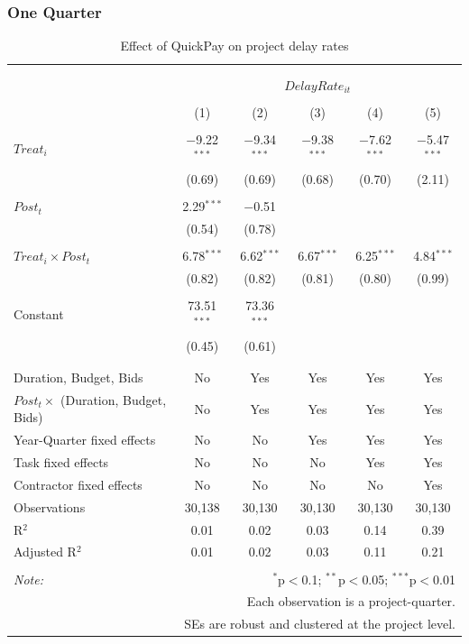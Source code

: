 \documentclass[
]{article}
\begin{document}
\hypertarget{one-quarter-4}{%
\subsubsection{One Quarter}\label{one-quarter-4}}

\begin{table}[H] \centering 
  \caption{Effect of QuickPay on project delay rates} 
  \label{} 
\small 
\begin{tabular}{@{\extracolsep{-2pt}}lccccc} 
\\[-1.8ex]\hline 
\hline \\[-1.8ex] 
\\[-1.8ex] & \multicolumn{5}{c}{$DelayRate_{it}$} \\ 
\\[-1.8ex] & (1) & (2) & (3) & (4) & (5)\\ 
\hline \\[-1.8ex] 
 $Treat_i$ & $-$9.22$^{***}$ & $-$9.34$^{***}$ & $-$9.38$^{***}$ & $-$7.62$^{***}$ & $-$5.47$^{***}$ \\ 
  & (0.69) & (0.69) & (0.68) & (0.70) & (2.11) \\ 
  & & & & & \\ 
 $Post_t$ & 2.29$^{***}$ & $-$0.51 &  &  &  \\ 
  & (0.54) & (0.78) &  &  &  \\ 
  & & & & & \\ 
 $Treat_i \times Post_t$ & 6.78$^{***}$ & 6.62$^{***}$ & 6.67$^{***}$ & 6.25$^{***}$ & 4.84$^{***}$ \\ 
  & (0.82) & (0.82) & (0.81) & (0.80) & (0.99) \\ 
  & & & & & \\ 
 Constant & 73.51$^{***}$ & 73.36$^{***}$ &  &  &  \\ 
  & (0.45) & (0.61) &  &  &  \\ 
  & & & & & \\ 
\hline \\[-1.8ex] 
Duration, Budget, Bids & No & Yes & Yes & Yes & Yes \\ 
$Post_t \times$  (Duration, Budget, Bids) & No & Yes & Yes & Yes & Yes \\ 
Year-Quarter fixed effects & No & No & Yes & Yes & Yes \\ 
Task fixed effects & No & No & No & Yes & Yes \\ 
Contractor fixed effects & No & No & No & No & Yes \\ 
Observations & 30,138 & 30,130 & 30,130 & 30,130 & 30,130 \\ 
R$^{2}$ & 0.01 & 0.02 & 0.03 & 0.14 & 0.39 \\ 
Adjusted R$^{2}$ & 0.01 & 0.02 & 0.03 & 0.11 & 0.21 \\ 
\hline 
\hline \\[-1.8ex] 
\textit{Note:}  & \multicolumn{5}{r}{$^{*}$p$<$0.1; $^{**}$p$<$0.05; $^{***}$p$<$0.01} \\ 
 & \multicolumn{5}{r}{Each observation is a project-quarter.} \\ 
 & \multicolumn{5}{r}{SEs are robust and clustered at the project level.} \\ 
\end{tabular} 
\end{table}
\end{document}

